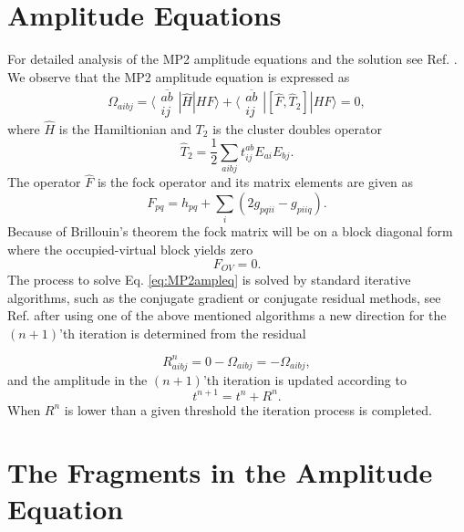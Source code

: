 \documentclass[12pt,a4paper,english]{article}
\newcommand{\braopket}[3]{\langle #1|#2|#3\rangle}
\begin{document}
\section{Amplitude Equations}

For detailed analysis of the MP2 amplitude equations and the solution see Ref. \cite{Kristensen2011}.
We observe that the MP2 amplitude equation is expressed as
\begin{equation}
  \Omega_{aibj}=\braopket{\substack{\overline{ab}\\ ij}}{\hat H}{HF}+\braopket{\substack{\overline{ab}\\ ij}}{[\hat F,\hat T_2]}{HF}=0,
  \label{eq:MP2ampleq}
\end{equation}
where $\hat H$ is the Hamiltionian and $T_2$ is the cluster doubles operator
\begin{equation}
  \hat T_2=\frac{1}{2}\sum_{aibj}t^{ab}_{ij}E_{ai}E_{bj}.
  \label{eq:t2ampl}
\end{equation}
The operator $\hat F$ is the fock operator and its matrix elements are given as
\begin{equation}
  F_{pq}=h_{pq}+\sum_{i}(2g_{pqii}-g_{piiq}).
  \label{eq:fockopele}
\end{equation}
Because of Brillouin's theorem the fock matrix will be on a block diagonal form where the occupied-virtual block yields zero
\begin{equation}
  F_{OV}=0.
  \label{eq:fockoccvirt}
\end{equation}
The process to solve Eq. \eqref{eq:MP2ampleq} is solved by standard iterative algorithms, such as the conjugate gradient or conjugate residual methods, see 
Ref. \cite{book:helgco} after using one of the above mentioned algorithms a new direction for the $(n+1)$'th iteration is determined from the residual 

\begin{equation}
  R^n_{aibj}=0-\Omega_{aibj}=-\Omega_{aibj},
  \label{eq:residuedef}
\end{equation}
and the amplitude in the $(n+1)$'th iteration is updated according to 
\begin{equation}
  t^{n+1}=t^n+R^n.
  \label{eq:n+1iteration}
\end{equation}
When $R^n$ is lower than a given threshold the iteration process is completed.

\section{The Fragments in the Amplitude Equation}
\end{document}
